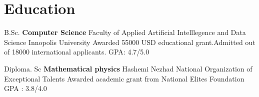 \section{Education}
    \cventry{}
            {B.Sc. \textbf{Computer Science}}
            {Faculty of Applied Artificial Intelllegence and Data Science}
            {Innopolis University}
            {Awarded 55000 USD educational grant.Admitted out of 18000 international applicants.}
            {GPA: 4.7/5.0} 
  
    \vspace{10pt}
    
    \cventry{}
            {Diploma. Sc \textbf{Mathematical physics}}
            {Hashemi Nezhad}
            {National Organization of Exceptional Talents}
            {Awarded academic grant from National Elites Foundation }
            {GPA : 3.8/4.0}
